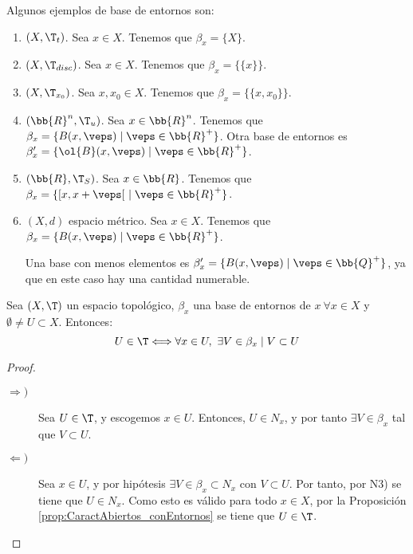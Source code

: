 \begin{ejemplo} Algunos ejemplos de base de entornos son:
\begin{enumerate}
    \item $(X, \T_t)$. Sea $x\in X$. Tenemos que $\beta_x=\{X\}$.

    \item $(X, \T_{disc})$. Sea $x\in X$. Tenemos que $\beta_x=\{\{x\}\}$.

    \item $(X, \T_{x_0})$. Sea $x,x_0\in X$. Tenemos que $\beta_x=\{\{x,x_0\}\}$.

    \item $(\bb{R}^n, \T_{u})$. Sea $x\in \bb{R}^n$. Tenemos que $\beta_x=\{B(x,\veps)\mid \veps\in \bb{R}^+\}$. Otra base de entornos es $\beta'_x=\{\ol{B}(x,\veps)\mid \veps\in \bb{R}^+\}$.

    \item $(\bb{R}, \T_{S})$. Sea $x\in \bb{R}$. Tenemos que $\beta_x=\{[x,x+\veps[~\mid \veps\in \bb{R}^+\}$.

    \item $(X, d)$ espacio métrico. Sea $x\in X$. Tenemos que $\beta_x=\{B(x,\veps)\mid \veps\in \bb{R}^+\}$.
    
    Una base con menos elementos es $\beta_x'=\{B(x,\veps)\mid \veps\in \bb{Q}^+\}$, ya que en este caso hay una cantidad numerable.
\end{enumerate}
    
\end{ejemplo}



\begin{prop}\label{prop:CaractAbiertos_conBasesEntornos}
    Sea $(X,\T)$ un espacio topológico, $\beta_x$ una base de entornos de $x~\forall x\in X$ y $\emptyset\neq U\subset X$. Entonces:
    \begin{equation*}
        U\in \T \Longleftrightarrow \forall x\in U,~\exists V\in \beta_x\mid V\subset U
    \end{equation*}
\end{prop}
\begin{proof}\
    \begin{description}
        \item[$\Longrightarrow)$] Sea $U\in \T$, y escogemos $x\in U$. Entonces, $U\in N_x$, y por tanto $\exists V\in \beta_x$ tal que $V\subset U$.
        
        \item[$\Longleftarrow)$] Sea $x\in U$, y por hipótesis $\exists V\in \beta_x\subset N_x$ con $V\subset U$. Por tanto, por N3) se tiene que $U\in N_x$. Como esto es válido para todo $x\in X$, por la Proposición \ref{prop:CaractAbiertos_conEntornos} se tiene que $U\in \T$.
    \end{description}
\end{proof}


